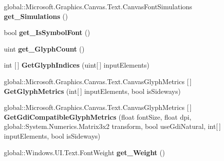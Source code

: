 \begin{DoxyCompactItemize}
global\+::\+Microsoft.\+Graphics.\+Canvas.\+Text.\+Canvas\+Font\+Simulations {\bfseries get\+\_\+\+Simulations} ()
\item 
\mbox{\label{interface_microsoft_1_1_graphics_1_1_canvas_1_1_text_1_1_i_canvas_font_face_a6416d478c22372ed75f43a3ab1d6d8f9}} 
bool {\bfseries get\+\_\+\+Is\+Symbol\+Font} ()
\item 
\mbox{\label{interface_microsoft_1_1_graphics_1_1_canvas_1_1_text_1_1_i_canvas_font_face_a7c9eb7f5f3fdb03cea2c156067bbe233}} 
uint {\bfseries get\+\_\+\+Glyph\+Count} ()
\item 
\mbox{\label{interface_microsoft_1_1_graphics_1_1_canvas_1_1_text_1_1_i_canvas_font_face_a940c7807b9ae5b022efa2a685392c526}} 
int \mbox{[}$\,$\mbox{]} {\bfseries Get\+Glyph\+Indices} (uint\mbox{[}$\,$\mbox{]} input\+Elements)
\item 
\mbox{\label{interface_microsoft_1_1_graphics_1_1_canvas_1_1_text_1_1_i_canvas_font_face_a287e4336eb4ba744584288150ac1f201}} 
global\+::\+Microsoft.\+Graphics.\+Canvas.\+Text.\+Canvas\+Glyph\+Metrics \mbox{[}$\,$\mbox{]} {\bfseries Get\+Glyph\+Metrics} (int\mbox{[}$\,$\mbox{]} input\+Elements, bool is\+Sideways)
\item 
\mbox{\label{interface_microsoft_1_1_graphics_1_1_canvas_1_1_text_1_1_i_canvas_font_face_a4e5a33ee705a9c9fc505d35ceddca4fc}} 
global\+::\+Microsoft.\+Graphics.\+Canvas.\+Text.\+Canvas\+Glyph\+Metrics \mbox{[}$\,$\mbox{]} {\bfseries Get\+Gdi\+Compatible\+Glyph\+Metrics} (float font\+Size, float dpi, global\+::\+System.\+Numerics.\+Matrix3x2 transform, bool use\+Gdi\+Natural, int\mbox{[}$\,$\mbox{]} input\+Elements, bool is\+Sideways)
\item 
\mbox{\label{interface_microsoft_1_1_graphics_1_1_canvas_1_1_text_1_1_i_canvas_font_face_ad97d3d431367976150ce2a63ff9246e9}} 
global\+::\+Windows.\+U\+I.\+Text.\+Font\+Weight {\bfseries get\+\_\+\+Weight} ()

\end{DoxyCompactItemize}
